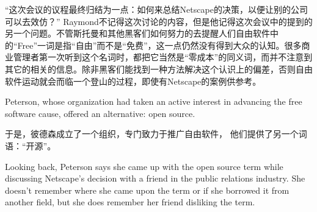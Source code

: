\ifdefined\chs
``这次会议的议程最终归结为一点：如何来总结Netscape的决策，以便让别的公司可以去效仿？'' Raymond不记得这次讨论的内容，但是他记得这次会议中的提到的另一个问题。不管斯托曼和其他黑客们如何努力的去提醒人们自由软件中的``Free''一词是指``自由''而不是``免费''，这一点仍然没有得到大众的认知。很多商业管理者第一次听到这个名词时，都把它当然是``零成本''的同义词，而并不注意到其它的相关的信息。除非黑客们能找到一种方法解决这个认识上的偏差，否则自由软件运动就会而临一个登山的过程，即使有Netscape的案例供参考。
\fi



\ifdefined\eng
Peterson, whose organization had taken an active interest in advancing the free software cause, offered an alternative: open source.
\fi

\ifdefined\chs
于是，彼德森成立了一个组织，专门致力于推广自由软件， 他们提供了另一个词语：``开源''。
\fi

\ifdefined\eng
Looking back, Peterson says she came up with the open source term while discussing Netscape's decision with a friend in the public relations industry. She doesn't remember where she came upon the term or if she borrowed it from another field, but she does remember her friend disliking the term.
\fi

